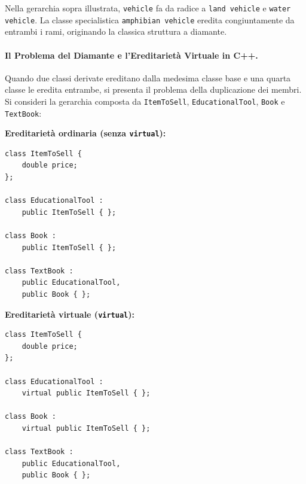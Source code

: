 \documentclass[12pt]{extarticle}
\newcommand{\cn}[1]{\makebox[\linewidth][c]{\textbf{#1}}}
\begin{document}
\begin{figure}[htbp]
    \centering
{}
    \label{fig:multiple_inheritance_diamond}
\end{figure}

\noindent Nella gerarchia sopra illustrata, \texttt{vehicle} fa da radice a \texttt{land vehicle} e \texttt{water vehicle}. La classe specialistica \texttt{amphibian vehicle} eredita congiuntamente da entrambi i rami, originando la classica struttura a diamante.

\paragraph{Il Problema del Diamante e l'Ereditarietà Virtuale in C++.}
Quando due classi derivate ereditano dalla medesima classe base e una quarta classe le eredita entrambe, si presenta il problema della duplicazione dei membri. Si consideri la gerarchia composta da \texttt{ItemToSell}, \texttt{EducationalTool}, \texttt{Book} e \texttt{TextBook}:

\begin{minipage}{0.48\textwidth}
\textbf{Ereditarietà ordinaria (senza \texttt{virtual}):}
\begin{verbatim}
class ItemToSell {
    double price;
};

class EducationalTool : 
    public ItemToSell { };

class Book : 
    public ItemToSell { };

class TextBook : 
    public EducationalTool, 
    public Book { };
\end{verbatim}
\end{minipage}
\hfill
\begin{minipage}{0.48\textwidth}
\textbf{Ereditarietà virtuale (\texttt{virtual}):}
\begin{verbatim}
class ItemToSell {
    double price;
};

class EducationalTool : 
    virtual public ItemToSell { };

class Book : 
    virtual public ItemToSell { };

class TextBook : 
    public EducationalTool, 
    public Book { };
\end{verbatim}
\end{minipage}
\end{document}
